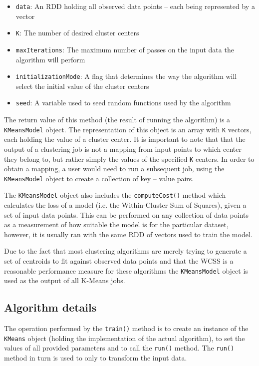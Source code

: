 \documentclass{l4proj}
\begin{document}
\begin{itemize}
\item \texttt{data}: An RDD holding all observed data points -- each being represented by a vector
\item \texttt{K}: The number of desired cluster centers
\item \texttt{maxIterations}: The maximum number of passes on the input data the algorithm will perform
\item \texttt{initializationMode}: A flag that determines the way the algorithm will select the initial value of the cluster centers
\item \texttt{seed}: A variable used to seed random functions used by the algorithm
\end{itemize}

The return value of this method (the result of running the algorithm) is a \texttt{KMeansModel} object. The representation of this object is an array with \texttt{K} vectors, each holding the value of a cluster center. It is important to note that that the output of a clustering job is not a mapping from input points to which center they belong to, but rather simply the values of the specified \texttt{K} centers. In order to obtain a mapping, a user would need to run a subsequent job, using the \texttt{KMeansModel} object to create a collection of key -- value pairs.

The \texttt{KMeansModel} object also includes the \texttt{computeCost()} method which calculates the loss of a model (i.e. the Within-Cluster Sum of Squares), given a set of input data points. This can be performed on any collection of data points as a measurement of how suitable the model is for the particular dataset, however, it is usually ran with the same RDD of vectors used to train the model.

Due to the fact that most clustering algorithms are merely trying to generate a set of centroids to fit against observed data points and that the WCSS is a reasonable performance measure for these algorithms the \texttt{KMeansModel} object is used as the output of all K-Means jobs.

\subsection{Algorithm details}

The operation performed by the \texttt{train()} method is to create an instance of the \texttt{KMeans} object (holding the implementation of the actual algorithm), to set the values of all provided parameters and to call the \texttt{run()} method. The \texttt{run()} method in turn is used to only to transform the input data. 
\end{document}
